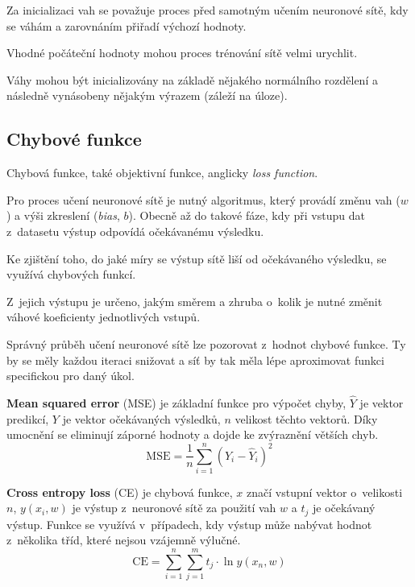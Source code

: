 \begin{compactitem}
    \item Za inicializaci vah se považuje proces před samotným učením neuronové sítě, kdy se váhám a zarovnáním přiřadí výchozí hodnoty.

    \item Vhodné počáteční hodnoty mohou proces trénování sítě velmi urychlit.

    \item Váhy mohou být inicializovány na základě nějakého normálního rozdělení a následně vynásobeny nějakým výrazem (záleží na úloze).
\end{compactitem}

\subsection{Chybové funkce}

\begin{compactitem}
    \item Chybová funkce, také objektivní funkce, anglicky \textit{loss function}.

    \item Pro proces učení neuronové sítě je nutný algoritmus, který provádí změnu vah ($w$) a výši zkreslení (\textit{bias}, $b$). Obecně až do takové fáze, kdy při vstupu dat z~datasetu výstup odpovídá očekávanému výsledku.

    \item Ke zjištění toho, do jaké míry se výstup sítě liší od očekávaného výsledku, se využívá chybových funkcí.

    \item Z~jejich výstupu je určeno, jakým směrem a zhruba o~kolik je nutné změnit váhové koeficienty jednotlivých vstupů.

    \item Správný průběh učení neuronové sítě lze pozorovat z~hodnot chybové funkce. Ty by se měly každou iteraci snižovat a síť by tak měla lépe aproximovat funkci specifickou pro daný úkol.

    \item \textbf{Mean squared error} (MSE) je základní funkce pro výpočet chyby, $\hat{Y}$ je vektor predikcí, $Y$ je vektor očekávaných výsledků, $n$ velikost těchto vektorů. Díky umocnění se eliminují záporné hodnoty a dojde ke zvýraznění větších chyb.
    \begin{equation}
        \mathrm{MSE}=\frac{1}{n} \sum_{i = 1}^{n} (Y_i - \hat{Y}_i)^2
        \label{eq_mse}
    \end{equation}

    \item \textbf{Cross entropy loss} (CE) je chybová funkce, $x$ značí vstupní vektor o~velikosti $n$, $y(x_i, w)$ je výstup z~neuronové sítě za použití vah $w$ a $t_j$ je očekávaný výstup. Funkce se využívá v~případech, kdy výstup může nabývat hodnot z~několika tříd, které nejsou vzájemně výlučné.
    \begin{equation}
        \mathrm{CE}=\sum_{i = 1}^{n} \sum_{j = 1}^{m} t_{j} \cdot \ln{y(x_n, w)}
        \label{eq_ce}
    \end{equation}
\end{compactitem}

